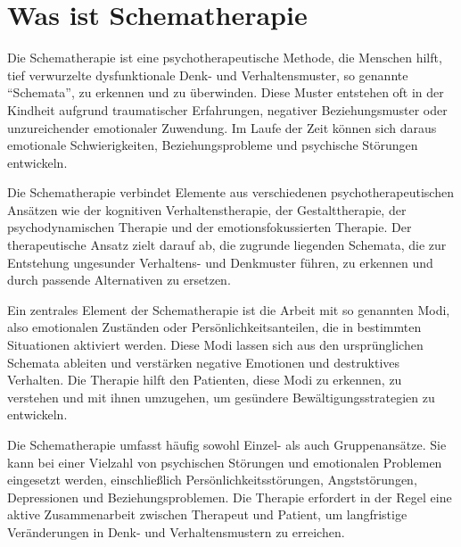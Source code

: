 \section{Was ist Schematherapie}
Die Schematherapie ist eine psychotherapeutische Methode, die Menschen hilft, tief verwurzelte dysfunktionale Denk- und Verhaltensmuster, so genannte \enquote{Schemata}, zu erkennen und zu überwinden. Diese Muster entstehen oft in der Kindheit aufgrund traumatischer Erfahrungen, negativer Beziehungsmuster oder unzureichender emotionaler Zuwendung. Im Laufe der Zeit können sich daraus emotionale Schwierigkeiten, Beziehungsprobleme und psychische Störungen entwickeln.

Die Schematherapie verbindet Elemente aus verschiedenen psychotherapeutischen Ansätzen wie der kognitiven Verhaltenstherapie, der Gestalttherapie, der psychodynamischen Therapie und der emotionsfokussierten Therapie. Der therapeutische Ansatz zielt darauf ab, die zugrunde liegenden Schemata, die zur Entstehung ungesunder Verhaltens- und Denkmuster führen, zu erkennen und durch passende Alternativen zu ersetzen.

Ein zentrales Element der Schematherapie ist die Arbeit mit so genannten Modi, also emotionalen Zuständen oder Persönlichkeitsanteilen, die in bestimmten Situationen aktiviert werden. Diese Modi lassen sich aus den ursprünglichen Schemata ableiten und verstärken negative Emotionen und destruktives Verhalten. Die Therapie hilft den Patienten, diese Modi zu erkennen, zu verstehen und mit ihnen umzugehen, um gesündere Bewältigungsstrategien zu entwickeln.

Die Schematherapie umfasst häufig sowohl Einzel- als auch Gruppenansätze. Sie kann bei einer Vielzahl von psychischen Störungen und emotionalen Problemen eingesetzt werden, einschließlich Persönlichkeitsstörungen, Angststörungen, Depressionen und Beziehungsproblemen. Die Therapie erfordert in der Regel eine aktive Zusammenarbeit zwischen Therapeut und Patient, um langfristige Veränderungen in Denk- und Verhaltensmustern zu erreichen.